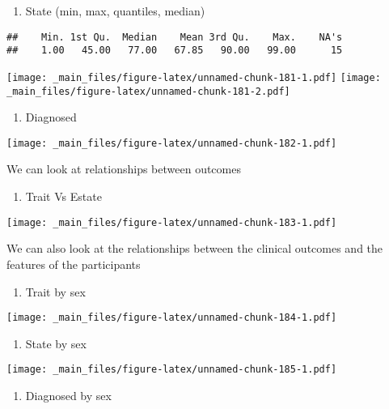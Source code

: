 \documentclass[
]{book}
\providecommand{\tightlist}{%
  \setlength{\itemsep}{0pt}\setlength{\parskip}{0pt}}
\begin{document}
\begin{enumerate}
\def\labelenumi{\alph{enumi}.}
\setcounter{enumi}{1}
\tightlist
\item
  State (min, max, quantiles, median)
\end{enumerate}

\begin{verbatim}
##    Min. 1st Qu.  Median    Mean 3rd Qu.    Max.    NA's 
##    1.00   45.00   77.00   67.85   90.00   99.00      15
\end{verbatim}

\texttt{[image: \_main\_files/figure-latex/unnamed-chunk-181-1.pdf]} \texttt{[image: \_main\_files/figure-latex/unnamed-chunk-181-2.pdf]}

\begin{enumerate}
\def\labelenumi{\alph{enumi}.}
\setcounter{enumi}{2}
\tightlist
\item
  Diagnosed
\end{enumerate}

\texttt{[image: \_main\_files/figure-latex/unnamed-chunk-182-1.pdf]}

We can look at relationships between outcomes

\begin{enumerate}
\def\labelenumi{\alph{enumi}.}
\setcounter{enumi}{3}
\tightlist
\item
  Trait Vs Estate
\end{enumerate}

\texttt{[image: \_main\_files/figure-latex/unnamed-chunk-183-1.pdf]}

We can also look at the relationships between the clinical outcomes and the features of the participants

\begin{enumerate}
\def\labelenumi{\alph{enumi}.}
\setcounter{enumi}{4}
\tightlist
\item
  Trait by sex
\end{enumerate}

\texttt{[image: \_main\_files/figure-latex/unnamed-chunk-184-1.pdf]}

\begin{enumerate}
\def\labelenumi{\alph{enumi}.}
\setcounter{enumi}{5}
\tightlist
\item
  State by sex
\end{enumerate}

\texttt{[image: \_main\_files/figure-latex/unnamed-chunk-185-1.pdf]}

\begin{enumerate}
\def\labelenumi{\alph{enumi}.}
\setcounter{enumi}{6}
\tightlist
\item
  Diagnosed by sex
\end{enumerate}
\end{document}
